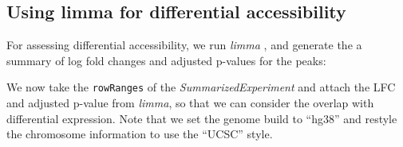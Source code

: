 \documentclass[
  9pt,
  a4paper,
]{extarticle}
\newenvironment{Shaded}{\begin{snugshade}}{\end{snugshade}}
\newcommand{\DataTypeTok}[1]{\textcolor[rgb]{0.13,0.29,0.53}{#1}}
\newcommand{\KeywordTok}[1]{\textcolor[rgb]{0.13,0.29,0.53}{\textbf{#1}}}
\newcommand{\NormalTok}[1]{#1}
\newcommand{\OperatorTok}[1]{\textcolor[rgb]{0.81,0.36,0.00}{\textbf{#1}}}
\newcommand{\StringTok}[1]{\textcolor[rgb]{0.31,0.60,0.02}{#1}}
\begin{document}
\hypertarget{using-limma-for-differential-accessibility}{%
\subsection{Using limma for differential accessibility}\label{using-limma-for-differential-accessibility}}

For assessing differential accessibility, we run \emph{limma} \citep{Smyth2004}, and
generate the a summary of log fold changes and adjusted p-values for the peaks:

\begin{Shaded}
\end{Shaded}

We now take the \texttt{rowRanges} of the \emph{SummarizedExperiment} and attach the LFC
and adjusted p-value from \emph{limma}, so that we can consider the overlap with
differential expression. Note that we set the genome build to ``hg38'' and
restyle the chromosome information to use the ``UCSC'' style.

\begin{Shaded}
\end{Shaded}
\end{document}
